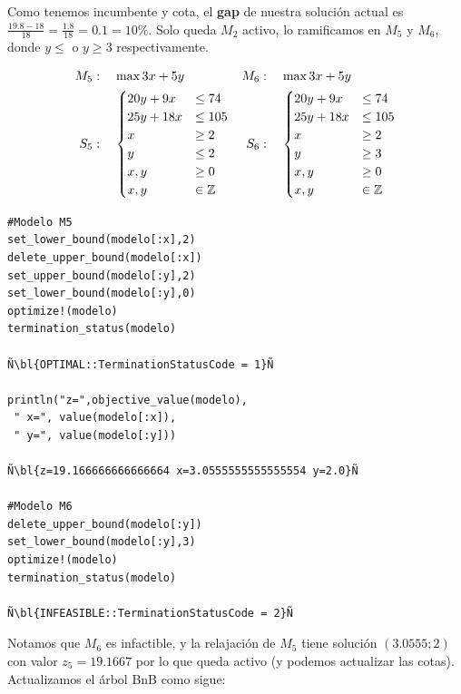     Como tenemos incumbente y cota, el \textbf{gap} de nuestra solución actual  es $\frac{19.8-18}{18}=\frac{1.8}{18}=0.1=10\%$. Solo queda $M_2$ activo, lo ramificamos en $M_5$ y $M_6$, donde $y\leq$ o $y\geq3$ respectivamente. 
    
    \begin{minipage}{0.4\textwidth}
    	\begin{align*}
    	M_5&:\quad 	\max 3x+5y & M_6&:\quad 	\max 3x+5y\\ 
    	S_5&:\quad \begin{cases}
    	20y+9x&\leq 74\\
    	25y+18x&\leq 105\\
    	x&\geq 2\\
    	y&\leq 2\\
    	x,y&\geq 0\\
    	x,y&\in \mathbb Z\end{cases}&S_6&:\quad \begin{cases}
    	20y+9x&\leq 74\\
    	25y+18x&\leq 105\\
    	x&\geq 2\\
    	y&\geq 3\\
    	x,y&\geq 0\\
    	x,y&\in \mathbb Z\end{cases}
    	\end{align*}
    \end{minipage}		
    \begin{minipage}{0.6\textwidth}
    		\begin{lstlisting}[escapechar=Ñ]
#Modelo M5
set_lower_bound(modelo[:x],2)
delete_upper_bound(modelo[:x])
set_upper_bound(modelo[:y],2) 
set_lower_bound(modelo[:y],0)
optimize!(modelo)
termination_status(modelo)

Ñ\bl{OPTIMAL::TerminationStatusCode = 1}Ñ

println("z=",objective_value(modelo),
 " x=", value(modelo[:x]),
 " y=", value(modelo[:y]))

Ñ\bl{z=19.166666666666664 x=3.0555555555555554 y=2.0}Ñ

#Modelo M6
delete_upper_bound(modelo[:y])
set_lower_bound(modelo[:y],3) 
optimize!(modelo)
termination_status(modelo)

Ñ\bl{INFEASIBLE::TerminationStatusCode = 2}Ñ
\end{lstlisting}
    \end{minipage}
    
    Notamos que $M_6$ es infactible, y la relajación de $M_5$ tiene solución $(3.0555;2)$ con valor $z_5=19.1667$ por lo que queda activo (y podemos actualizar las cotas). Actualizamos el árbol BnB como sigue:
    	
